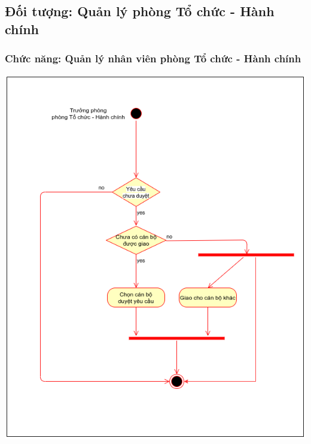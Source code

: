 \subsection{Đối tượng: Quản lý phòng Tổ chức - Hành chính}
\subsubsection{Chức năng: Quản lý nhân viên phòng Tổ chức - Hành chính}
\begin{center}
  \captionsetup{type=figure}
  \includegraphics[width=15cm]{img/UML/Manager/assignTask.png}
\end{center}
